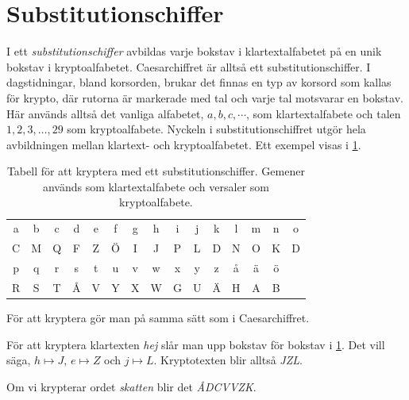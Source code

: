 \section{Substitutionschiffer}
\label{sec:Substitution}
I ett \emph{substitutionschiffer} avbildas varje 
bokstav i klartextalfabetet på en unik bokstav i kryptoalfabetet.
Caesarchiffret är alltså ett substitutionschiffer.
I dagstidningar, bland korsorden, brukar det finnas en typ av korsord som 
kallas för krypto, där rutorna är markerade med tal och varje tal motsvarar en 
bokstav.
Här används alltså det vanliga alfabetet, \(a, b, c, \cdots\), som 
klartextalfabete och talen \(1,2,3,\ldots, 29\) som kryptoalfabete.
Nyckeln i substitutionschiffret utgör hela avbildningen mellan klartext- och 
kryptoalfabetet.
Ett exempel visas i \cref{tbl:Substitutionschiffer}.

\begin{table}
  \caption{%
    Tabell för att kryptera med ett substitutionschiffer.
		Gemener används som klartextalfabete och versaler som kryptoalfabete.
  }\label{tbl:Substitutionschiffer}
	\centering
	\begin{tabular}{ccccccccccccccc}
    \toprule
    a & b & c & d & e & f & g & h & i & j & k & l & m & n & o \\
		C & M & Q & F & Z & Ö & I & J & P & L & D & N & O & K & D \\
    \midrule
    p & q & r & s & t & u & v & w & x & y & z & å & ä & ö \\
		R & S & T & Å & V & Y & X & W & G & U & Ä & H & A & B \\
    \bottomrule
  \end{tabular}
\end{table}

För att kryptera gör man på samma sätt som i Caesarchiffret.

\begin{example}\label{ex:SubstitutionHej}
  För att kryptera klartexten \emph{hej} slår man upp bokstav för bokstav 
  i \cref{tbl:Substitutionschiffer}.
	Det vill säga, \(h\mapsto J\), \(e\mapsto Z\) och 
	\(j\mapsto L\).
	Kryptotexten blir alltså \emph{JZL}.
\end{example}

\begin{example}\label{ex:SubstitutionSkatten}
	Om vi krypterar ordet \emph{skatten} blir det \emph{ÅDCVVZK}.
\end{example}


